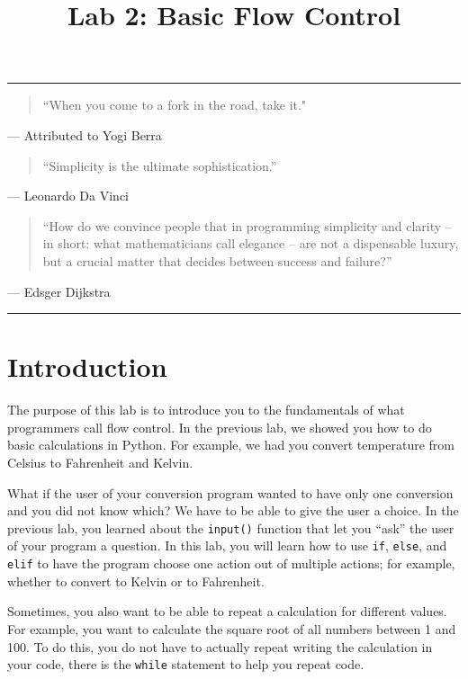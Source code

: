 \documentclass[11pt]{cselabheader}
\title{Lab 2: Basic Flow Control}
\begin{document}
\maketitle

\hrule

\begin{quotation}
``When you come to a fork in the road, take it."
\end{quotation}
\begin{flushright}
--- Attributed to Yogi Berra
\end{flushright}

\begin{quotation}
``Simplicity is the ultimate sophistication.''
\end{quotation}
\begin{flushright}
--- Leonardo Da Vinci
\end{flushright}

\begin{quotation}
``How do we convince people that in programming simplicity and clarity -- in
short: what mathematicians call elegance -- are not a dispensable luxury, but
a crucial matter that decides between success and failure?''
\end{quotation}
\begin{flushright}
--- Edsger Dijkstra
\end{flushright}

\hrule

\section{Introduction}
The purpose of this lab is to introduce you to the fundamentals of what
programmers call flow control. In the previous lab, we showed you how to do
basic calculations in Python. For example, we had you convert temperature from
Celsius to Fahrenheit and Kelvin.

What if the user of your conversion program wanted to have only one conversion
and you did not know which? We have to be able to give the user a choice. In the
previous lab, you learned about the \lstinline!input()! function that let you
``ask'' the user of your program a question. In this lab, you will learn how to
use \lstinline!if!, \lstinline!else!, and \lstinline!elif! to have the program
choose one action out of multiple actions; for example, whether to convert to
Kelvin or to Fahrenheit.

Sometimes, you also want to be able to repeat a calculation for different
values. For example, you want to calculate the square root of all numbers
between 1 and 100. To do this, you do not have to actually repeat writing the
calculation in your code, there is the \lstinline!while! statement to help you
repeat code.
\end{document}
